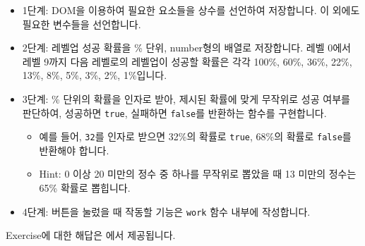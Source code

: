 \begin{itemize}
    \item 1단계: DOM을 이용하여 필요한 요소들을 상수를 선언하여 저장합니다. 이 외에도 필요한 변수들을 선언합니다. 
    \item 2단계: 레벨업 성공 확률을 \% 단위, number형의 배열로 저장합니다. 레벨 0에서 레벨 9까지 다음 레벨로의 레벨업이 성공할 확률은 각각 100\%, 60\%, 36\%, 22\%, 13\%, 8\%, 5\%, 3\%, 2\%, 1\%입니다. 
    \item 3단계: \% 단위의 확률을 인자로 받아, 제시된 확률에 맞게 무작위로 성공 여부를 판단하여, 성공하면 \texttt{true}, 실패하면 \texttt{false}를 반환하는 함수를 구현합니다. 
    \begin{itemize}
        \item 예를 들어, \texttt{32}를 인자로 받으면 32\%의 확률로 \texttt{true}, 68\%의 확률로 \texttt{false}를 반환해야 합니다. 
        \item Hint: 0 이상 20 미만의 정수 중 하나를 무작위로 뽑았을 때 13 미만의 정수는 65\% 확률로 뽑힙니다. 
    \end{itemize}
    \item 4단계: 버튼을 눌렀을 때 작동할 기능은 \texttt{work} 함수 내부에 작성합니다. 
\end{itemize}

Exercise에 대한 해답은 에서 제공됩니다.
